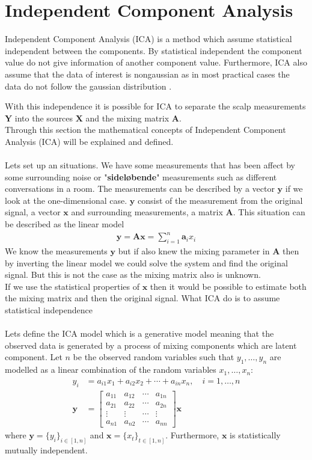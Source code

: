\section{Independent Component Analysis}\label{sec:ICA}
Independent Component Analysis (ICA) is a method which assume statistical independent between the components. By statistical independent the component value do not give information of another component value. Furthermore, ICA also assume that the data of interest is nongaussian as in most practical cases the data do not follow the gaussian distribution \cite[p. 3]{ICA}.


With this independence it is possible for ICA to separate the scalp measurements $\mathbf{Y}$ into the sources $\mathbf{X}$ and the mixing matrix $\mathbf{A}$.
\\
Through this section the mathematical concepts of Independent Component Analysis (ICA) will be explained and defined.
\\ \\
Lets set up an situations. We have some measurements that has been affect by some surrounding noise or "\textbf{sideløbende}" measurements such as different conversations in a room. The measurements can be described by a vector $\mathbf{y}$ if we look at the one-dimensional case. $\mathbf{y}$ consist of the measurement from the original signal, a vector $\mathbf{x}$ and surrounding measurements, a matrix $\mathbf{A}$. This situation can be described as the linear model
\begin{align*}
\mathbf{y} = \mathbf{Ax} = \sum_{i=1}^n \mathbf{a}_i x_i
\end{align*}
We know the measurements $\mathbf{y}$ but if also knew the mixing parameter in $\mathbf{A}$ then by inverting the linear model we could solve the system and find the original signal. But this is not the case as the mixing matrix also is unknown.
\\
If we use the statistical properties of $\mathbf{x}$ then it would be possible to estimate both the mixing matrix and then the original signal. What ICA do is to assume statistical independence 
\\ \\
Lets define the ICA model which is a generative model meaning that the observed data is generated by a process of mixing components which are latent component. Let $n$ be the observed random variables such that $y_1, \dots, y_n$ are modelled as a linear combination of the random variables $x_1, \dots, x_n$:
\begin{align*}
y_i &= a_{i1} x_1 + a_{i2} x_2 + \cdots + a_{in} x_n, \quad i = 1, \dots, n \\
\mathbf{y} &= 
\begin{bmatrix}
a_{11} & a_{12} & \cdots & a_{1n} \\
a_{21} & a_{22} & \cdots & a_{2n} \\
\vdots & \vdots & \cdots & \vdots \\
a_{n1} & a_{n2} & \cdots & a_{nn}
\end{bmatrix}
\mathbf{x}
\end{align*}
where $\mathbf{y} = \{ y_i \}_{i \in [1,n]}$ and $\mathbf{x} = \{ x_t \}_{t \in [1,n]}$. Furthermore, $\mathbf{x}$ is statistically mutually independent.


